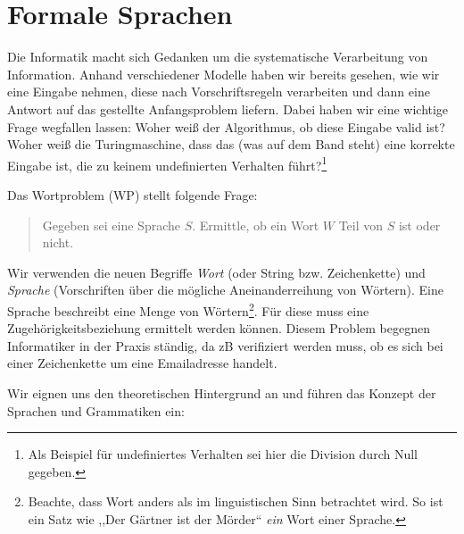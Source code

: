 \chapter{Formale Sprachen}
%
Die Informatik macht sich Gedanken um die systematische Verarbeitung von Information. Anhand verschiedener Modelle haben wir bereits gesehen, wie wir eine Eingabe nehmen, diese nach Vorschriftsregeln verarbeiten und dann eine Antwort auf das gestellte Anfangsproblem liefern. Dabei haben wir eine wichtige Frage wegfallen lassen: Woher weiß der Algorithmus, ob diese Eingabe valid ist? Woher weiß die Turingmaschine, dass das (was auf dem Band steht) eine korrekte Eingabe ist, die zu keinem undefinierten Verhalten führt?\footnote{Als Beispiel für undefiniertes Verhalten sei hier die Division durch Null gegeben.}

Das Wortproblem (WP) stellt folgende Frage:
\begin{quotation}
  Gegeben sei eine Sprache $S$. Ermittle, ob ein Wort $W$ Teil von $S$ ist oder nicht.
\end{quotation}
%
Wir verwenden die neuen Begriffe \emph{Wort} (oder String bzw. Zeichenkette) und \emph{Sprache} (Vorschriften über die mögliche Aneinanderreihung von Wörtern). Eine Sprache beschreibt eine Menge von Wörtern\footnote{Beachte, dass Wort anders als im linguistischen Sinn betrachtet wird. So ist ein Satz wie ,,Der Gärtner ist der Mörder`` \emph{ein} Wort einer Sprache.}. Für diese muss eine Zugehörigkeitsbeziehung ermittelt werden können. Diesem Problem begegnen Informatiker in der Praxis ständig, da zB verifiziert werden muss, ob es sich bei einer Zeichenkette um eine Emailadresse handelt.

Wir eignen uns den theoretischen Hintergrund an und führen das Konzept der Sprachen und Grammatiken ein:

